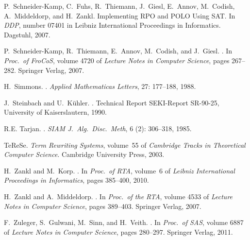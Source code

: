 \documentclass{LMCS}
\begin{document}
\begin{thebibliography}{59}
P.~Schneider-Kamp, C.~Fuhs, R.~Thiemann, J.~Giesl, E.~Annov, M.~Codish,
  A.~Middeldorp, and H.~Zankl.
\newblock Implementing {RPO} and {POLO} {U}sing {SAT}.
\newblock In \emph{DDP}, number 07401 in Leibniz International Proceedings in
  Informatics. Dagstuhl, 2007{}.

P.~Schneider-Kamp, R.~Thiemann, E.~Annov, M.~Codish, and J.~Giesl.
.
\newblock In \emph{Proc.\ of  FroCoS}, volume 4720 of \emph{Lecture
  Notes in Computer Science}, pages 267--282. Springer Verlag,
  2007{}.

H.~Simmons.
.
\newblock \emph{Applied Mathematicas Letters}, 27: 177--188, 1988.

J.~Steinbach and U.~K{\"u}hler.
.
\newblock Technical Report SEKI-Report SR-90-25, University of Kaiserslautern,
  1990.

R.E. Tarjan.
.
\newblock \emph{SIAM J.~Alg.\ Disc.\ Meth}, 6 (2): 306--318,
  1985.

Te{R}e{S}e.
\newblock \emph{{Term Rewriting Systems}}, volume~55 of \emph{Cambridge Tracks
  in Theoretical Computer Science}.
\newblock Cambridge University Press, 2003.

H.~Zankl and M.~Korp.
.
\newblock In \emph{Proc.\ of  RTA}, volume~6 of \emph{Leibniz
  International Proceedings in Informatics}, pages 385--400, 2010.

H.~Zankl and A.~Middeldorp.
.
\newblock In \emph{Proc.\ of the  RTA}, volume 4533 of \emph{Lecture
  Notes in Computer Science}, pages 389--403. Springer Verlag, 2007.

F.~Zuleger, S.~Gulwani, M.~Sinn, and H.~Veith.
.
\newblock In \emph{Proc.\ of  SAS}, volume 6887 of \emph{Lecture Notes
  in Computer Science}, pages 280--297. Springer Verlag, 2011.

\end{thebibliography}
 
\end{document}
